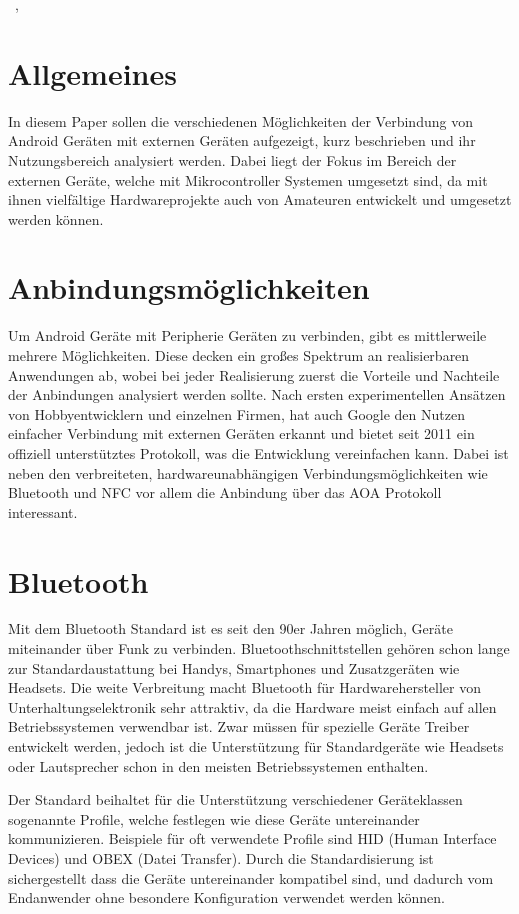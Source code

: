 \documentclass[12pt,journal,compsoc]{IEEEtran}
\begin{document}
\hfill{\the\day~\Monat, \the\year  }

\section{Allgemeines}
In diesem Paper sollen die verschiedenen Möglichkeiten der Verbindung von Android Geräten mit externen Geräten aufgezeigt, kurz beschrieben und ihr Nutzungsbereich analysiert werden.
Dabei liegt der Fokus im Bereich der externen Geräte, welche mit Mikrocontroller Systemen umgesetzt sind, da mit ihnen vielfältige Hardwareprojekte auch von Amateuren entwickelt und umgesetzt werden können.

\section{Anbindungsmöglichkeiten}
Um Android Geräte mit Peripherie Geräten zu verbinden, gibt es mittlerweile mehrere Möglichkeiten.
Diese decken ein großes Spektrum an realisierbaren Anwendungen ab, wobei bei jeder Realisierung zuerst die Vorteile und Nachteile der Anbindungen analysiert werden sollte.
Nach ersten experimentellen Ansätzen von Hobbyentwicklern und einzelnen Firmen, hat auch Google den Nutzen einfacher Verbindung mit externen Geräten 
erkannt und bietet seit 2011 ein offiziell unterstütztes Protokoll, was die Entwicklung vereinfachen kann.
Dabei ist neben den verbreiteten, hardwareunabhängigen Verbindungsmöglichkeiten wie Bluetooth und NFC vor allem die Anbindung über das AOA Protokoll interessant. 

\section{Bluetooth}
Mit dem Bluetooth Standard ist es seit den 90er Jahren möglich, Geräte miteinander über Funk zu verbinden. Bluetoothschnittstellen gehören schon lange zur Standardaustattung bei Handys, Smartphones und Zusatzgeräten wie Headsets.
Die weite Verbreitung macht Bluetooth für Hardwarehersteller von Unterhaltungselektronik sehr attraktiv, da die Hardware meist einfach auf allen Betriebssystemen verwendbar ist.
Zwar müssen für spezielle Geräte Treiber entwickelt werden, jedoch ist die Unterstützung für Standardgeräte wie Headsets oder Lautsprecher schon in den meisten Betriebssystemen enthalten.

Der Standard beihaltet für die Unterstützung verschiedener Geräteklassen sogenannte Profile, welche festlegen wie diese Geräte untereinander kommunizieren.
Beispiele für oft verwendete Profile sind HID (Human Interface Devices) und OBEX (Datei Transfer). 
Durch die Standardisierung ist sichergestellt dass die Geräte untereinander kompatibel sind, und dadurch vom Endanwender ohne besondere Konfiguration verwendet werden können.
\cite{bluetooth}
\end{document}
